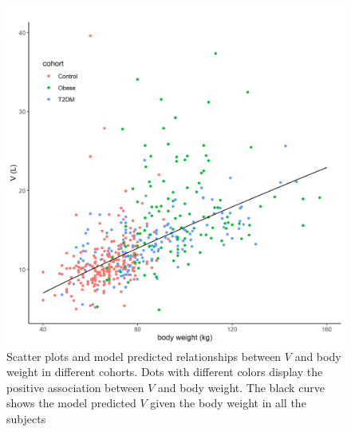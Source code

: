 \documentclass[utf8]{frontiersSCNS} %
\begin{document}
\begin{figure}[h!]
\begin{center}
\includegraphics[width=15cm]{V_BW.PNG}
\end{center}
\caption{Scatter plots and model predicted relationships between $V$ and body weight in different cohorts. Dots with different colors display the positive association between $V$ and body weight. The black curve shows the model predicted $V$ given the body weight in all the subjects}
\label{fig: V_BW}
\end{figure}
\end{document}
